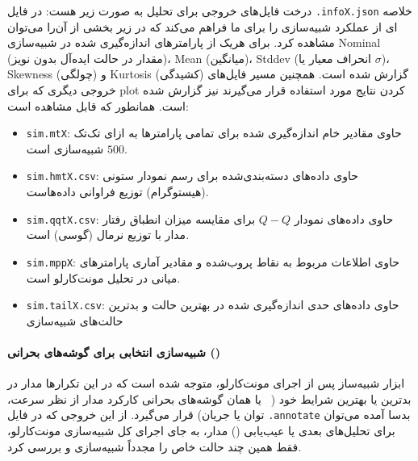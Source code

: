 درخت فایل‌های خروجی برای تحلیل  به صورت زیر هست:
در فایل \texttt{.infoX.json} خلاصه ای از عملکرد شبیه‌سازی را برای ما فراهم می‌کند که در زیر بخشی از آن‌را می‌توان مشاهده کرد.
برای هریک از پارامتر‌های اندازه‌گیری شده در شبیه‌سازی
Nominal (مقدار در حالت ایده‌آل بدون نویز)، Mean (میانگین)، Stddev (انحراف معیار یا $\sigma$)، Skewness (چولگی) و Kurtosis (کشیدگی) گزارش شده است.
همچنین مسیر فایل‌های خروجی دیگری که برای plot کردن نتایج مورد استفاده قرار می‌گیرند نیز گزارش شده است.
همانطور که قابل مشاهده است:
\begin{itemize}
    \setlength{\itemsep}{1pt}
    \setlength{\parskip}{0pt}
    \setlength{\parsep}{0pt}
    \item \texttt{sim.mtX}: حاوی مقادیر خام اندازه‌گیری شده برای تمامی پارامترها به ازای تک‌تک $500$ شبیه‌سازی است.
    \item \texttt{sim.hmtX.csv}: حاوی داده‌های دسته‌بندی‌شده برای رسم نمودار ستونی (هیستوگرام) توزیع فراوانی داده‌هاست.
    \item \texttt{sim.qqtX.csv}: حاوی داده‌های نمودار $Q-Q$ برای مقایسه میزان انطباق رفتار مدار با توزیع نرمال (گوسی) است.
    \item \texttt{sim.mppX}: حاوی اطلاعات مربوط به نقاط پروب‌شده و مقادیر آماری پارامترهای میانی در تحلیل مونت‌کارلو است.
    \item \texttt{sim.tailX.csv}: حاوی داده‌های حدی اندازه‌گیری شده در بهترین حالت و بدترین حالت‌های شبیه‌سازی
\end{itemize}

\newpage


\newpage

\paragraph{شبیه‌سازی انتخابی برای گوشه‌های بحرانی ()
}
ابزار شبیه‌ساز پس از اجرای مونت‌کارلو، متوجه شده است که در این تکرارها مدار در بدترین یا بهترین شرایط خود (\
 یا همان گوشه‌های بحرانی کارکرد مدار از نظر سرعت، توان یا جریان) قرار می‌گیرد.
از این خروجی که در فایل \texttt{.annotate} بدسا آمده می‌توان برای تحلیل‌های بعدی یا عیب‌یابی () مدار، به جای اجرای کل شبیه‌سازی مونت‌کارلو، فقط همین چند حالت خاص را مجدداً شبیه‌سازی و بررسی کرد.

